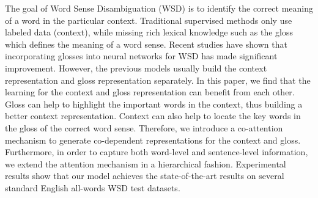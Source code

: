 The goal of Word Sense Disambiguation (WSD) is to identify the correct meaning of a word in the particular context. Traditional supervised methods only use labeled data (context), while missing rich lexical knowledge such as the gloss which defines the meaning of a word sense. Recent studies have shown that incorporating glosses into neural networks for WSD has made significant improvement. However, the previous models usually build the context representation and gloss representation separately. In this paper, we find that the learning for the context and gloss representation can benefit from each other. Gloss can help to highlight the important words in the context, thus building a better context representation. Context can also help to locate the key words in the gloss of the correct word sense. Therefore, we introduce a co-attention mechanism to generate co-dependent representations for the context and gloss. Furthermore, in order to capture both word-level and sentence-level information, we extend the attention mechanism in a hierarchical fashion. Experimental results show that our model achieves the state-of-the-art results on several standard English all-words WSD test datasets.
